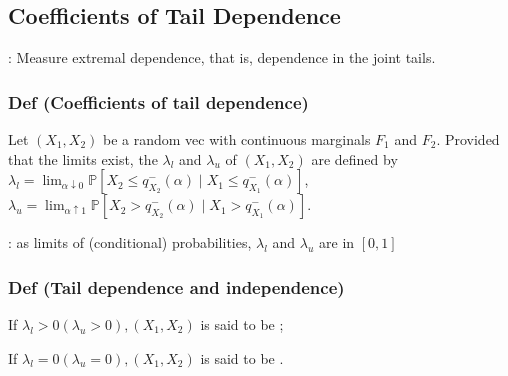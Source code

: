 \subsection*{Coefficients of Tail Dependence}
: Measure extremal dependence, that is, dependence in the joint tails.

\subsubsection*{Def (Coefficients of tail dependence)} 
Let $\left(X_{1}, X_{2}\right)$ be a random vec with continuous marginals $F_{1}$ and $F_{2}$. Provided that the limits exist, the  $\lambda_{l}$ and  $\lambda_{u}$ of $\left(X_{1}, X_{2}\right)$ are defined by
$\lambda_{l} =\lim _{\alpha \downarrow 0} \mathbb{P}\left[X_{2} \leq q_{X_{2}}^{-}(\alpha) \mid X_{1} \leq q_{X_{1}}^{-}(\alpha)\right] $, $\lambda_{u} =\lim _{\alpha \uparrow 1} \mathbb{P}\left[X_{2}>q_{X_{2}}^{-}(\alpha) \mid X_{1}>q_{X_{1}}^{-}(\alpha)\right]$.

: as limits of (conditional) probabilities, $\lambda_{l}$ and $\lambda_{u}$ are in $[0,1]$

\subsubsection*{Def (Tail dependence and independence)}
If $\lambda_{l}>0\left(\lambda_{u}>0\right),\left(X_{1}, X_{2}\right)$ is said to be ;

If $\lambda_{l}=0\left(\lambda_{u}=0\right),\left(X_{1}, X_{2}\right)$ is said to be .

